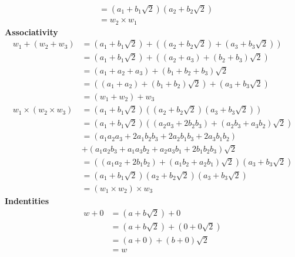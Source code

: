 \documentclass[addpoints]{exam}
\theoremstyle{mytheoremstyle}
\theoremstyle{mytheoremstyle}
\theoremstyle{myproblemstyle}
\begin{document}
\begin{questions}
\begin{parts}
\begin{solution}
\begin{align*}
				                  & = (a_{1}+b_{1}\sqrt{2})(a_{2}+b_{2}\sqrt{2})               \\
				                  & = w_{2}\times w_{1}
			\end{align*}
			\textbf{Associativity}
			\begin{align*}
				w_{1}+(w_{2}+w_{3})             & = (a_{1}+b_{1}\sqrt{2})+((a_{2}+b_{2}\sqrt{2})+(a_{3}+b_{3}\sqrt{2}))             \\
				                                & = (a_{1}+b_{1}\sqrt{2})+((a_{2}+a_{3})+(b_{2}+b_{3})\sqrt{2})                     \\
				                                & = (a_{1}+a_{2}+a_{3})+(b_{1}+b_{2}+b_{3})\sqrt{2}                                 \\
				                                & = ((a_{1}+a_{2})+(b_{1}+b_{2})\sqrt{2})+(a_{3}+b_{3}\sqrt{2})                     \\
				                                & = (w_{1}+w_{2})+w_{3}                                                             \\
				w_{1}\times (w_{2}\times w_{3}) & = (a_{1}+b_{1}\sqrt{2})((a_{2}+b_{2}\sqrt{2})(a_{3}+b_{3}\sqrt{2}))               \\
				                                & = (a_{1}+b_{1}\sqrt{2})((a_{2}a_{3}+2b_{2}b_{3})+(a_{2}b_{3}+a_{3}b_{2})\sqrt{2}) \\
				                                & = (a_{1}a_{2}a_{3}+2a_{1}b_{2}b_{3}+2a_{2}b_{1}b_{3}+2a_{3}b_{1}b_{2})            \\
				                                & +(a_{1}a_{2}b_{3}+a_{1}a_{3}b_{2}+a_{2}a_{3}b_{1}+2b_{1}b_{2}b_{3})\sqrt{2}       \\
				                                & = ((a_{1}a_{2}+2b_{1}b_{2})+(a_{1}b_{2}+a_{2}b_{1})\sqrt{2})(a_{3}+b_{3}\sqrt{2}) \\
				                                & = (a_{1}+b_{1}\sqrt{2})(a_{2}+b_{2}\sqrt{2})(a_{3}+b_{3}\sqrt{2})                 \\
				                                & = (w_{1}\times w_{2})\times w_{3}
			\end{align*}
			\textbf{Indentities}
			\begin{align*}
				w+0       & = (a+b\sqrt{2})+0                  \\
				          & = (a+b\sqrt{2})+(0+0\sqrt{2})      \\
				          & = (a+0)+(b+0)\sqrt{2}              \\
				          & = w                                \\

\end{align*}
\end{solution}
\end{parts}
\end{questions}
\end{document}
